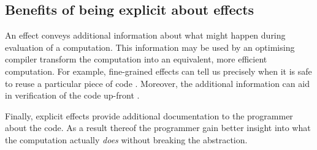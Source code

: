 \subsection{Benefits of being explicit about effects}
An effect conveys additional information about what might happen during evaluation of a computation. This information may be used by an optimising compiler transform the computation into an equivalent, more efficient computation. For example, fine-grained effects can tell us precisely when it is safe to reuse a particular piece of code \cite{Kammar2012}. Moreover, the additional information can aid in verification of the code up-front \cite{Brady2013}.

Finally, explicit effects provide additional documentation to the programmer about the code. As a result thereof the programmer gain better insight into what the computation actually \emph{does} without breaking the abstraction.

